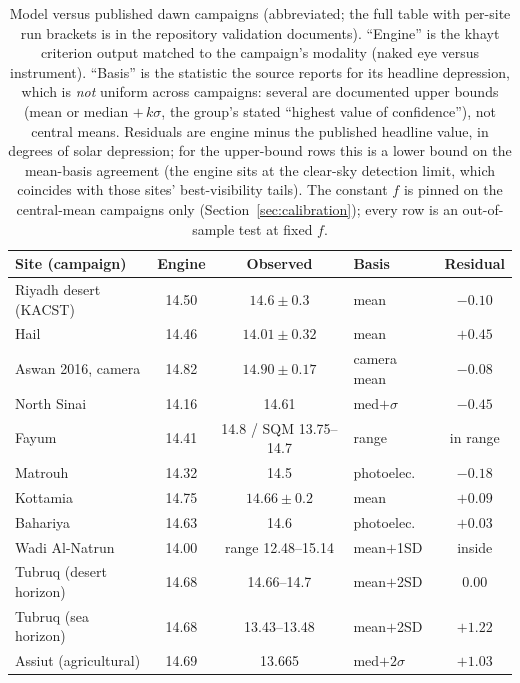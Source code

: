 \documentclass[preprint,12pt]{elsarticle}
\begin{document}
\begin{table}[t]
\centering
\caption{Model versus published dawn campaigns (abbreviated; the full
table with per-site run brackets is in the repository validation
documents). ``Engine'' is the khayt criterion output matched to the
campaign's modality (naked eye versus instrument). ``Basis'' is the
statistic the source reports for its headline depression, which is
\emph{not} uniform across campaigns: several are documented upper
bounds (mean or median $+\,k\sigma$, the group's stated ``highest value
of confidence''), not central means. Residuals are engine minus the
published headline value, in degrees of solar depression; for the
upper-bound rows this is a lower bound on the mean-basis agreement
(the engine sits at the clear-sky detection limit, which coincides
with those sites' best-visibility tails). The constant $f$ is pinned
on the central-mean campaigns only (Section~\ref{sec:calibration});
every row is an out-of-sample test at fixed $f$.}
\label{tab:campaigns}
\footnotesize
\setlength{\tabcolsep}{3pt}
\begin{tabular}{lcclc}
\toprule
Site (campaign) & Engine & Observed & Basis & Residual \\
\midrule
Riyadh desert (KACST) \citep{almostafa2005} & 14.50 & $14.6 \pm 0.3$ & mean & $-0.10$ \\
Hail \citep{khalifa2018} & 14.46 & $14.01 \pm 0.32$ & mean & $+0.45$ \\
Aswan 2016, camera \citep{mawad2024} & 14.82 & $14.90 \pm 0.17$ & camera mean & $-0.08$ \\
North Sinai \citep{hassan2016} & 14.16 & 14.61 & med$+\sigma$ & $-0.45$ \\
Fayum \citep{rashed2022} & 14.41 & 14.8 / SQM 13.75--14.7 & range & in range \\
Matrouh \citep{hassan2013matrouh} & 14.32 & 14.5 & photoelec.\ & $-0.18$ \\
Kottamia \citep{hassan2014} & 14.75 & $14.66 \pm 0.2$ & mean & $+0.09$ \\
Bahariya \citep{hassan2014} & 14.63 & 14.6 & photoelec.\ & $+0.03$ \\
Wadi Al-Natrun \citep{semeida2018} & 14.00 & range 12.48--15.14 & mean$+$1SD & inside \\
Tubruq (desert horizon) \citep{hassan2015tubruq} & 14.68 & 14.66--14.7 & mean$+$2SD & $0.00$ \\
Tubruq (sea horizon) \citep{hassan2015tubruq} & 14.68 & 13.43--13.48 & mean$+$2SD & $+1.22$ \\
Assiut (agricultural) \citep{hassan2016} & 14.69 & 13.665 & med$+2\sigma$ & $+1.03$ \\

\end{tabular}
\end{table}
\end{document}
